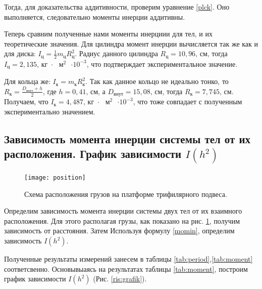 \documentclass[a4paper,12pt]{article}
\begin{document}
	Тогда, для доказательства аддитивности, проверим уравнение \eqref{plck}. Оно выполняется, следовательно моменты инерции аддитивны.
	
	Теперь сравним полученные нами моменты инерциии для тел, и их теоретические значения. Для цилиндра момент инерции вычисляется так же как и для диска: $I_\text{ц} = \frac{1}{2}m_\text{ц}R_\text{ц}^2$. Радиус данного цилиндра $R_\text{ц} = 10,96\text{, см}$, тогда $I_\text{ц} = 2,135 \text{,  кг $\cdot$ $\text{м}^2$ $\cdot 10^{-3}$}$, что подтверждает экспериментальное значение.
	
	Для кольца же: $I_\text{к} = m_\text{к}R_\text{к}^2$. Так как данное кольцо не идеально тонко, то $R_\text{к} = \frac{D_\text{внут} + h}{2}$, где $h = 0,41 \text{, см}$, а $D_\text{внут} = 15,08\text{, см}$, тогда $R_\text{к} = 7,745 \text{, см}$. Получаем, что $I_\text{к} = 4,487\text{,  кг $\cdot$ $\text{м}^2$ $\cdot 10^{-3}$}$, что тоже совпадает с полученным экспериментально значением.
	
	\subsection{Зависимость момента инерции системы тел от их расположения. График зависимости $I(h^2)$}
	
	\begin{figure}
		\vspace{-3em}
		\texttt{[image: position]}
		\caption{Схема расположения грузов на платформе трифилярного подвеса.}
		\label{ris:position}
	\end{figure}
	
	Определим зависимость момента инерции системы двух тел от их взаимного расположения. Для этого располагая грузы, как показано на рис. \ref{ris:position}, получим зависимость от расстояния. Затем Используя формулу \ref{momin}, определим зависимость $I(h^2)$.
	
	Полученные результаты измерений занесем в таблицы \eqref{tab:period},\eqref{tab:moment} соответсвенно. Основывыаясь на результатах таблицы \eqref{tab:moment}, построим график зависимости $ I(h^{2}) $ (Рис. \ref{ris:grafik}).
	\bigskip\bigskip\bigskip\bigskip\bigskip
	
\end{document}
